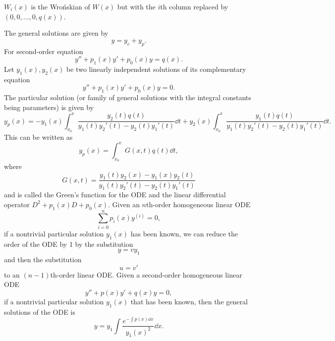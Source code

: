 \documentclass[a4paper,12pt]{article}
\begin{document}
\item $W_i(x)$ is the Wrońskian of $W(x)$ but with the $i$th column replaced by $(0,0,\ldots,0,q(x))$.
\eit
\item The general solutions are given by
\[y=y_c+y_p.\]
\een
{}
For second-order equation
\[y''+p_1(x)y'+p_0(x)y=q(x).\]
Let $y_1(x),y_2(x)$ be two linearly independent solutions of its complementary equation
\[y''+p_1(x)y'+p_0(x)y=0.\]
The particular solution (or family of general solutions with the integral constants being parameters) is given by
\[y_p(x)=-y_1(x)\int_{x_0}^x\frac{y_2(t)q(t)}{y_1(t)y_2'(t)-y_2(t)y_1'(t)}\dd{t}+y_2(x)\int_{x_0}^x\frac{y_1(t)q(t)}{y_1(t)y_2'(t)-y_2(t)y_1'(t)}\dd{t}.\]
This can be written as
\[y_p(x)=\int_{x_0}^xG(x,t)q(t)\dd{t},\]
where
\[G(x,t)=\frac{y_1(t)y_2(x)-y_1(x)y_2(t)}{y_1(t)y_2'(t)-y_2(t)y_1'(t)}\]
and is called the Green's function for the ODE and the linear differential operator $D^2+p_1(x)D+p_0(x)$.
Given an $n$th-order homogeneous linear ODE
\[\sum_{i=0}^np_i(x)y^{(i)}=0,\]
if a nontrivial particular solution $y_1(x)$ has been known, we can reduce the order of the ODE by 1 by the substitution
\[y=vy_1\]
and then the substitution
\[u=v'\]
to an $(n-1)$th-order linear ODE.
Given a second-order homogeneous linear ODE
\[y''+p(x)y'+q(x)y=0,\]
if a nontrivial particular solution $y_1(x)$ that has been known, then the general solutions of the ODE is
\[y=y_1\int\frac{e^{-\int p(x)\dd{x}}}{y_1(x)^2}\dd{x}.\]
\end{document}
